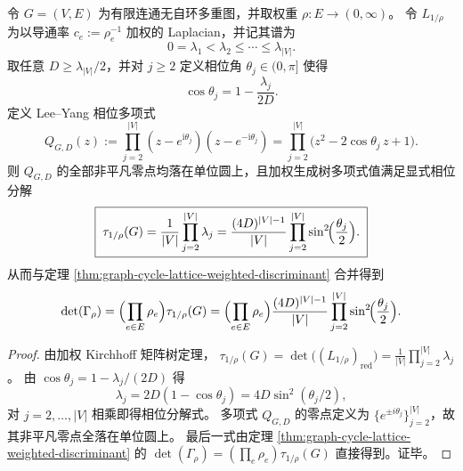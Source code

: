 \begin{proposition}\label{prop:graph-cycle-lattice-leyang-phase-polynomial}
令 \(G=(V,E)\) 为有限连通无自环多重图，并取权重 \(\rho:E\to(0,\infty)\)。
令 \(L_{1/\rho}\) 为以导通率 \(c_e:=\rho_e^{-1}\) 加权的 Laplacian，并记其谱为
\[
0=\lambda_1<\lambda_2\le\cdots\le \lambda_{|V|}.
\]
取任意 \(D\ge \lambda_{|V|}/2\)，并对 \(j\ge 2\) 定义相位角 \(\theta_j\in(0,\pi]\) 使得
\[
\cos\theta_j=1-\frac{\lambda_j}{2D}.
\]
定义 Lee--Yang 相位多项式
\[
Q_{G,D}(z):=\prod_{j=2}^{|V|}(z-e^{\mathrm{i}\theta_j})(z-e^{-\mathrm{i}\theta_j})
=\prod_{j=2}^{|V|}\bigl(z^2-2\cos\theta_j\,z+1\bigr).
\]
则 \(Q_{G,D}\) 的全部非平凡零点均落在单位圆上，且加权生成树多项式值满足显式相位分解
\[
\boxed{\;
\tau_{1/\rho}(G)
=\frac{1}{|V|}\prod_{j=2}^{|V|}\lambda_j
=\frac{(4D)^{|V|-1}}{|V|}\prod_{j=2}^{|V|}\sin^2\!\Bigl(\frac{\theta_j}{2}\Bigr).\;}
\]
从而与定理 \ref{thm:graph-cycle-lattice-weighted-discriminant} 合并得到
\[
\det(\Gamma_\rho)
=\Bigl(\prod_{e\in E}\rho_e\Bigr)\tau_{1/\rho}(G)
=\Bigl(\prod_{e\in E}\rho_e\Bigr)\frac{(4D)^{|V|-1}}{|V|}\prod_{j=2}^{|V|}\sin^2\!\Bigl(\frac{\theta_j}{2}\Bigr).
\]
\end{proposition}
\begin{proof}
由加权 Kirchhoff 矩阵树定理，
\(
\tau_{1/\rho}(G)=\det\bigl((L_{1/\rho})_{\mathrm{red}}\bigr)=\frac1{|V|}\prod_{j=2}^{|V|}\lambda_j
\)。
由 \(\cos\theta_j=1-\lambda_j/(2D)\) 得
\[
\lambda_j=2D(1-\cos\theta_j)=4D\sin^2(\theta_j/2),
\]
对 \(j=2,\dots,|V|\) 相乘即得相位分解式。
多项式 \(Q_{G,D}\) 的零点定义为 \(\{e^{\pm i\theta_j}\}_{j=2}^{|V|}\)，故其非平凡零点全落在单位圆上。
最后一式由定理 \ref{thm:graph-cycle-lattice-weighted-discriminant} 的 \(\det(\Gamma_\rho)=(\prod_e\rho_e)\tau_{1/\rho}(G)\) 直接得到。证毕。
\end{proof}

\endinput
